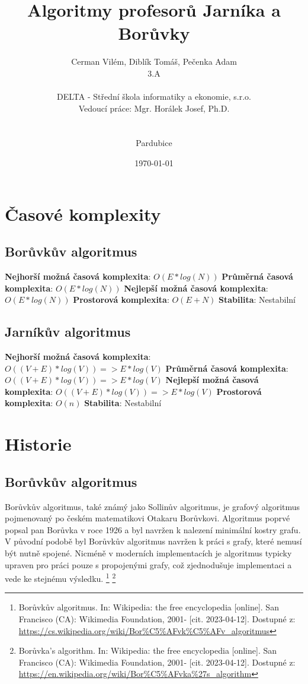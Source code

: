 \documentclass[11pt]{article}
\author{Cerman Vilém, Diblík Tomáš, Pečenka Adam \\ 3.A \\\\ DELTA - Střední škola informatiky a ekonomie, s.r.o.\\Vedoucí práce: Mgr. Horálek Josef, Ph.D.\\\\\\Pardubice}
\title{Algoritmy profesorů Jarníka a Borůvky}
\date{\selectlanguage{czech}\today}
\begin{document}
\maketitle
\thispagestyle{empty}
\pagebreak

\tableofcontents
\thispagestyle{empty}
\pagebreak

\setcounter{page}{1}
\section{Časové komplexity}

\subsection{Borůvkův algoritmus}

\medbreak
\textbf{Nejhorší možná časová komplexita}: $O(E * log(N))$
\medbreak\noindent
\textbf{Průměrná časová komplexita}: $O(E * log(N))$
\medbreak\noindent
\textbf{Nejlepší možná časová komplexita}: $O(E * log(N))$
\medbreak\noindent
\textbf{Prostorová komplexita}: $O(E + N)$
\medbreak\noindent
\textbf{Stabilita}: Nestabilní
\medbreak

\subsection{Jarníkův algoritmus}

\medbreak
\textbf{Nejhorší možná časová komplexita}: $O((V + E)*log(V)) => E*log(V)$
\medbreak\noindent
\textbf{Průměrná časová komplexita}: $O((V + E)*log(V)) => E*log(V)$
\medbreak\noindent
\textbf{Nejlepší možná časová komplexita}: $O((V + E)*log(V)) => E*log(V)$
\medbreak\noindent
\textbf{Prostorová komplexita}: $O(n)$
\medbreak\noindent
\textbf{Stabilita}: Nestabilní
\medbreak

\pagebreak


\section{Historie}

\subsection{Borůvkův algoritmus}
Borůvkův algoritmus, také známý jako Sollinův algoritmus, je grafový algoritmus pojmenovaný po českém matematikovi Otakaru Borůvkovi. Algoritmus poprvé popsal pan Borůvka v roce 1926 a byl navržen k nalezení minimální kostry grafu. V původní podobě byl Borůvkův algoritmus navržen k práci s grafy, které nemusí být nutně spojené. Nicméně v moderních implementacích je algoritmus typicky upraven pro práci pouze s propojenými grafy, což zjednodušuje implementaci a vede ke stejnému výsledku.
\footnote{Borůvkův algoritmus. In: Wikipedia: the free encyclopedia [online]. San Francisco (CA): Wikimedia Foundation, 2001- [cit. 2023-04-12]. Dostupné z: \url{https://cs.wikipedia.org/wiki/Bor\%C5\%AFvk\%C5\%AFv_algoritmus}}
\footnote{Borůvka's algorithm. In: Wikipedia: the free encyclopedia [online]. San Francisco (CA): Wikimedia Foundation, 2001- [cit. 2023-04-12]. Dostupné z: \url{https://en.wikipedia.org/wiki/Bor\%C5\%AFvka\%27s_algorithm}}
\end{document}
